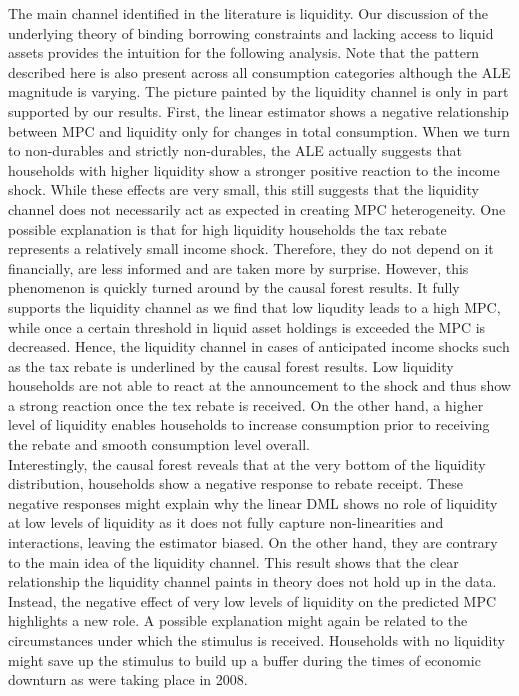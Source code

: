 The main channel identified in the literature is liquidity. Our discussion of the underlying theory of binding borrowing constraints and lacking access to liquid assets provides the intuition for the following analysis. Note that the pattern described here is also present across all consumption categories although the ALE magnitude is varying. The picture painted by the liquidity channel is only in part supported by our results. First, the linear estimator shows a negative relationship between MPC and liquidity only for changes in total consumption. When we turn to non-durables and strictly non-durables, the ALE actually suggests that households with higher liquidity show a stronger positive reaction to the income shock. While these effects are very small, this still suggests that the liquidity channel does not necessarily act as expected in creating MPC heterogeneity. One possible explanation is that for high liquidity households the tax rebate represents a relatively small income shock. Therefore, they do not depend on it financially, are less informed and are taken more by surprise. However, this phenomenon is quickly turned around by the causal forest results. It fully supports the liquidity channel as we find that low liqudity leads to a high MPC, while once a certain threshold in liquid asset holdings is exceeded the MPC is decreased. Hence, the liquidity channel in cases of anticipated income shocks such as the tax rebate is underlined by the causal forest results. Low liquidity households are not able to react at the announcement to the shock and thus show a strong reaction once the tex rebate is received. On the other hand, a higher level of liquidity enables households to increase consumption prior to receiving the rebate and smooth consumption level overall. \\
Interestingly, the causal forest reveals that at the very bottom of the liquidity distribution, households show a negative response to rebate receipt. These negative responses might explain why the linear DML shows no role of liquidity at low levels of liquidity as it does not fully capture non-linearities and interactions, leaving the estimator biased. On the other hand, they are contrary to the main idea of the liquidity channel. This result shows that the clear relationship the liquidity channel paints in theory does not hold up in the data. Instead, the negative effect of very low levels of liquidity on the predicted MPC highlights a new role. A possible explanation might again be related to the circumstances under which the stimulus is received. Households with no liquidity might save up the stimulus to build up a buffer during the times of economic downturn as were taking place in 2008. \\
